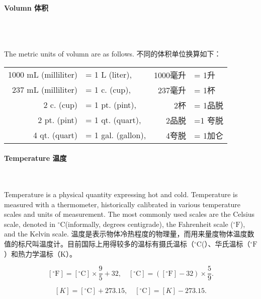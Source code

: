 \paragraph{Volumn 体积}
\ \\ \ 

\begin{paracol}{2}
The metric units of volumn are as follows.
\switchcolumn
不同的体积单位换算如下：
\end{paracol}

\begin{table}[!hbtp]
\begin{center}
\begin{tabular}{rlrl}
1000 mL (milliliter) &= 1 L (liter), & 1000毫升 &= 1升\\
237 mL (milliliter) &= 1 c. (cup), & 237毫升 &= 1杯\\
2 c. (cup) &= 1 pt. (pint), & 2杯 &= 1品脱\\
2 pt. (pint) &= 1 qt. (quart), & 2品脱 &=1 夸脱\\
4 qt. (quart) &= 1 gal. (gallon), & 4夸脱 &= 1加仑
\end{tabular}
\end{center}
\end{table}

\paragraph{Temperature 温度}
\ \\ 

\begin{paracol}{2}
Temperature is a physical quantity expressing hot and cold. Temperature is measured with a thermometer, historically calibrated in various temperature scales and units of measurement. The most commonly used scales are the Celsius scale, denoted in $^\circ \mathrm{C}$(informally, degrees centigrade), the Fahrenheit scale ($^\circ \mathrm{F}$), and the Kelvin scale.
\switchcolumn
温度是表示物体冷热程度的物理量，而用来量度物体温度数值的标尺叫温度计。目前国际上用得较多的温标有摄氏温标（$^\circ \mathrm{C}$(）、华氏温标（$^\circ \mathrm{F}$）和热力学温标（K）。
\end{paracol}

$$
[^\circ \mathrm{F}] = [^\circ \mathrm{C}]\times \dfrac{9}{5} + 32, \quad  [^\circ \mathrm{C}] = ([^\circ \mathrm{F}]-32)\times \dfrac{5}{9}.
$$

$$
[K] = [^\circ \mathrm{C}] +273.15,\quad [^\circ \mathrm{C}] = [K] - 273.15.
$$
\newpage
